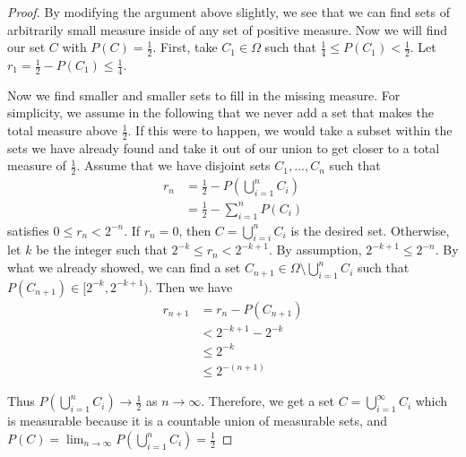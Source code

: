 \documentclass[a4paper]{article}
\begin{document}
\begin{enumerate}
\begin{proof}
        By modifying the argument above slightly, we see that we can find sets of arbitrarily small measure inside of any set of positive measure. Now
        we will find our set $C$ with $P(C) = \frac{1}{2}$. First, take $C_1 \in \Omega$ such that $\frac{1}{4} \leq P(C_1) < \frac{1}{2}$. Let $r_1 =
        \frac{1}{2} - P(C_1) \leq \frac{1}{4}$.

        Now we find smaller and smaller sets to fill in the missing measure. For simplicity, we assume in the following that we never add a set that
        makes the total measure above $\frac{1}{2}$. If this were to happen, we would take a subset within the sets we have already found and take it
        out of our union to get closer to a total measure of $\frac{1}{2}$. Assume that we have disjoint sets $C_1, \dots, C_n$ such that
        \begin{align*}
          r_n &= \frac{1}{2} - P \left( \bigcup_{i=1}^n C_i \right) \\
          &= \frac{1}{2} - \sum_{i=1}^n P(C_i)
        \end{align*}
        satisfies $0 \leq r_n < 2^{-n}$. If $r_n = 0$, then $C = \bigcup_{i = i}^n C_i$ is the desired set. Otherwise, let $k$ be the
        integer such that $2^{-k} \leq r_n < 2^{-k+1}$. By assumption, $2^{-k+1} \leq 2^{-n}$. By what we already showed, we can find a set $C_{n+1} \in \Omega
        \setminus \bigcup_{i=1}^n C_i$ such that $P(C_{n+1}) \in [2^{-k}, 2^{-k+1})$. Then we have
          \begin{align*}
            r_{n+1} &= r_{n} - P(C_{n+1}) \\
            &< 2^{-k+1} - 2^{-k} \\
            &\leq 2^{-k} \\
            &\leq 2^{-(n+1)}
          \end{align*}

          Thus $P(\bigcup_{i=1}^n C_i) \to \frac{1}{2}$ as $n \to \infty$. Therefore, we get a set $C = \bigcup_{i=1}^\infty C_i$ which is measurable
          because it is a countable union of measurable sets, and $P(C) = \lim_{n \to \infty} P( \bigcup_{i=1}^n C_i ) = \frac{1}{2}$

    \end{proof}

\end{enumerate}
\end{document}

